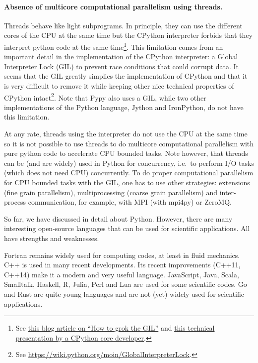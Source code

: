 \paragraph{Absence of multicore computational parallelism using threads.}
Threads behave like light subprograms. In principle, they can use the different
cores of the CPU at the same time but the CPython interpreter forbids that they
interpret python code at the same time\footnote{See
\href{https://opensource.com/article/17/4/grok-gil}{this blog article on ``How
to grok the GIL''} and
\href{https://faster-cpython.readthedocs.io/cpython37.html}{this technical
presentation by a CPython core developer}.}.
%
This limitation comes from an important detail in the implementation of the
CPython interpreter: a Global Interpreter Lock (GIL) to prevent race conditions
that could corrupt data.
%
It seems that the GIL greatly simplies the implementation of CPython and that it
is very difficult to remove it while keeping other nice technical properties of
CPython intact\footnote{See \url{https://wiki.python.org/moin/GlobalInterpreterLock}.}.
Note that Pypy also uses a GIL, while two other implementations of the Python
language, Jython and IronPython, do not have this limitation.

At any rate, threads using the interpreter do not use the CPU at the same time
so it is not possible to use threads to do multicore computational parallelism
with pure python code to accelerate CPU bounded tasks.
%
Note however, that threads can be (and are widely) used in Python for
concurrency, i.e.\ to perform I/O tasks (which does not need CPU) concurrently.
%
To do proper computational parallelism for CPU bounded tasks with the GIL, one has
to use other strategies: extensions (fine grain parallelism), multiprocessing
(coarse grain parallelism) and inter-process communication, for example, with MPI
(with mpi4py) or ZeroMQ.



So far, we have discussed in detail about Python. However, there are many
interesting open-source languages that can be used for scientific applications.
All have strengths and weaknesses.

Fortran remains widely used for computing codes, at least in fluid mechanics.
C++ is used in many recent developments. Its recent improvements (C++11, C++14)
make it a modern and very useful language.
%
JavaScript, Java, Scala, Smalltalk, Haskell, R, Julia, Perl and Lua are used for
some scientific codes. Go and Rust are quite young languages and are not (yet)
widely used for scientific applications.

